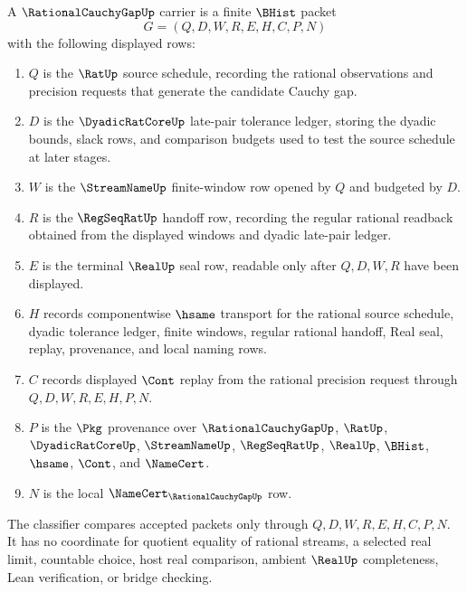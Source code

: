 \begin{definition}
\label{def:rational-cauchy-gap-carrier}
A $\RationalCauchyGapUp$ carrier is a finite $\BHist$ packet
$$
G=(Q,D,W,R,E,H,C,P,N)
$$
with the following displayed rows:
\begin{enumerate}
\item $Q$ is the $\RatUp$ source schedule, recording the rational observations and precision requests that generate the candidate Cauchy gap.
\item $D$ is the $\DyadicRatCoreUp$ late-pair tolerance ledger, storing the dyadic bounds, slack rows, and comparison budgets used to test the source schedule at later stages.
\item $W$ is the $\StreamNameUp$ finite-window row opened by $Q$ and budgeted by $D$.
\item $R$ is the $\RegSeqRatUp$ handoff row, recording the regular rational readback obtained from the displayed windows and dyadic late-pair ledger.
\item $E$ is the terminal $\RealUp$ seal row, readable only after $Q,D,W,R$ have been displayed.
\item $H$ records componentwise $\hsame$ transport for the rational source schedule, dyadic tolerance ledger, finite windows, regular rational handoff, Real seal, replay, provenance, and local naming rows.
\item $C$ records displayed $\Cont$ replay from the rational precision request through $Q,D,W,R,E,H,P,N$.
\item $P$ is the $\Pkg$ provenance over $\RationalCauchyGapUp$, $\RatUp$, $\DyadicRatCoreUp$, $\StreamNameUp$, $\RegSeqRatUp$, $\RealUp$, $\BHist$, $\hsame$, $\Cont$, and $\NameCert$.
\item $N$ is the local $\NameCert_{\RationalCauchyGapUp}$ row.
\end{enumerate}
The classifier compares accepted packets only through $Q,D,W,R,E,H,C,P,N$. It has no coordinate for quotient equality of rational streams, a selected real limit, countable choice, host real comparison, ambient $\RealUp$ completeness, Lean verification, or bridge checking.
\end{definition}

